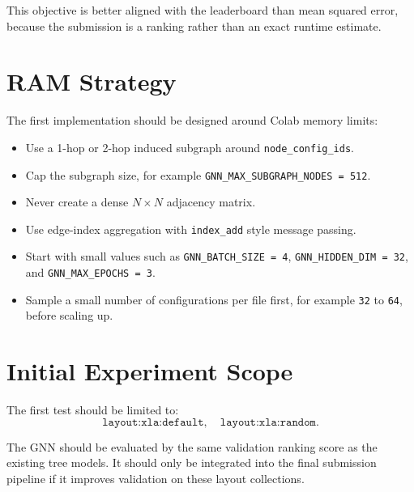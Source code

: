 \documentclass[11pt]{article}
\begin{document}
This objective is better aligned with the leaderboard than mean squared error,
because the submission is a ranking rather than an exact runtime estimate.

\section{RAM Strategy}

The first implementation should be designed around Colab memory limits:

\begin{itemize}
    \item Use a 1-hop or 2-hop induced subgraph around \texttt{node\_config\_ids}.
    \item Cap the subgraph size, for example \texttt{GNN\_MAX\_SUBGRAPH\_NODES = 512}.
    \item Never create a dense \(N \times N\) adjacency matrix.
    \item Use edge-index aggregation with \texttt{index\_add} style message passing.
    \item Start with small values such as \texttt{GNN\_BATCH\_SIZE = 4},
          \texttt{GNN\_HIDDEN\_DIM = 32}, and \texttt{GNN\_MAX\_EPOCHS = 3}.
    \item Sample a small number of configurations per file first, for example
          \texttt{32} to \texttt{64}, before scaling up.
\end{itemize}

\section{Initial Experiment Scope}

The first test should be limited to:
\[
\texttt{layout:xla:default}, \quad \texttt{layout:xla:random}.
\]

The GNN should be evaluated by the same validation ranking score as the existing
tree models. It should only be integrated into the final submission pipeline if
it improves validation on these layout collections.
\end{document}
